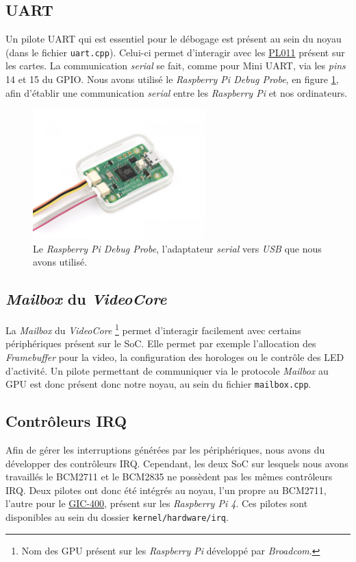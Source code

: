 \documentclass[french, 12pt]{article}
\newcommand{\rpi}{\emph{Raspberry Pi}}
\begin{document}
\subsection{UART}
Un pilote UART qui est essentiel pour le débogage est présent au sein du noyau
(dans le fichier \texttt{uart.cpp}). Celui-ci permet d'interagir avec les
\href{https://developer.arm.com/Processors/PL011}{PL011} présent sur les cartes.
La communication \textit{serial} se fait, comme pour Mini UART, via les
\textit{pins} 14 et 15 du GPIO. Nous avons utilisé le
\textit{Raspberry Pi Debug Probe}, en figure \ref{img:debug-probe}, afin
d'établir une communication \textit{serial} entre les \rpi{} et nos ordinateurs.

\begin{figure}[htp]
    \begin{center}
        \includegraphics[height=5cm]{debug-probe.jpg}
    \end{center}
    \caption{Le \textit{Raspberry Pi Debug Probe}, l'adaptateur \textit{serial}
        vers \textit{USB} que nous avons utilisé.}
    \label{img:debug-probe}
\end{figure}


\subsection{\textit{Mailbox} du \textit{VideoCore}}
La \textit{Mailbox} du \textit{VideoCore}%
\footnote{Nom des GPU présent sur les \rpi{} développé par \emph{Broadcom}.}
permet d'interagir facilement avec certains périphériques présent sur le
SoC. Elle permet par exemple l'allocation des \textit{Framebuffer}
pour la video, la configuration des horologes ou le contrôle des LED d'activité.
Un pilote permettant de communiquer via le protocole \textit{Mailbox} au GPU est
donc présent donc notre noyau, au sein du fichier \texttt{mailbox.cpp}.

\subsection{Contrôleurs IRQ}
Afin de gérer les interruptions générées par les périphériques, nous avons du
développer des contrôleurs IRQ. Cependant, les deux SoC sur lesquels nous avons
travaillés le BCM2711 et le BCM2835 ne possèdent pas les mêmes contrôleurs IRQ.
Deux pilotes ont donc été intégrés au noyau, l'un propre au BCM2711, l'autre
pour le \href{https://developer.arm.com/Processors/CoreLink%20GIC-400}{GIC-400},
présent sur les \textit{Raspberry Pi 4}. Ces pilotes sont disponibles au sein du
dossier \texttt{kernel/hardware/irq}.
\end{document}

